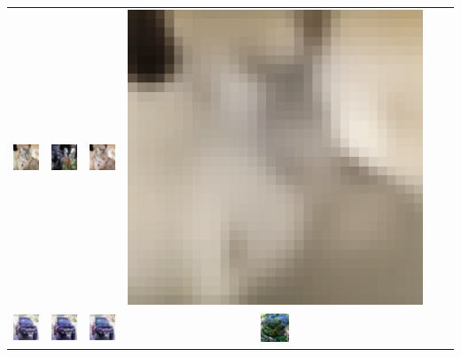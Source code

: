 \begin{table}[h!]
{\begin{tabular}{cccccc}
        \includegraphics[width=.145\textwidth]{chapter4/figures/images/cifar10/corrected_reconstruction/9.png} &
        \includegraphics[width=.145\textwidth]{chapter4/figures/images/cifar10/diffusion_decoder_beta_0.01/9.png} &
        \includegraphics[width=.145\textwidth]{chapter4/figures/images/cifar10/diffusion_decoder_beta_0/9.png} &
        \includegraphics[width=.145\textwidth]{chapter4/figures/images/cifar10/VAE_reconstruction/9.png} \\
        \includegraphics[width=.145\textwidth]{chapter4/figures/images/cifar10/original/10.png} &   
        \includegraphics[width=.145\textwidth]{chapter4/figures/images/cifar10/reconstruction/10.png} &
        \includegraphics[width=.145\textwidth]{chapter4/figures/images/cifar10/corrected_reconstruction/10.png} &
        \includegraphics[width=.145\textwidth]{chapter4/figures/images/cifar10/diffusion_decoder_beta_0.01/10.png} &

\end{tabular}}
\end{table}
